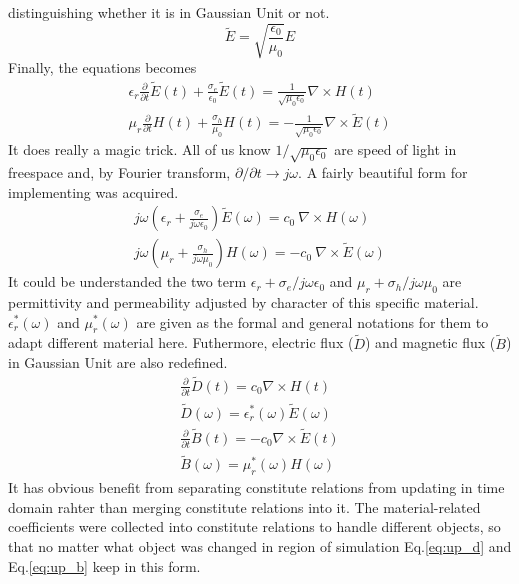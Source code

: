 distinguishing whether it is in Gaussian Unit or not.
\label{eq:gaussian_unit}
\begin{equation}
  {\displaystyle\widetilde{E} = \sqrt{\frac{\epsilon_0}{\mu_0}}E}
\end{equation}
Finally, the equations becomes
\begin{gather}
  \epsilon_r\frac{\partial}{\partial t}\widetilde{E}(t) + \frac{\sigma_e}{\epsilon_0}\widetilde{E}(t) = \frac{1}{\sqrt{\mu_0\epsilon_0}}\nabla\times H(t)\\
  \mu_r\frac{\partial}{\partial t} H(t) + \frac{\sigma_h}{\mu_0}H(t) = - \frac{1}{\sqrt{\mu_0\epsilon_0}}\nabla\times\widetilde{E}(t)
\end{gather}
It does really a magic trick. All of us know $1/\sqrt{\mu_0\epsilon_0}$ are speed of light in freespace and, by Fourier
transform, $\partial/\partial t \rightarrow j\omega$. A fairly beautiful form for implementing was acquired.
\begin{gather}
  j\omega\left(\epsilon_r + \frac{\sigma_e}{j\omega\epsilon_0}\right)\widetilde{E}(\omega) = c_0\ \nabla\times H(\omega)\\
  j\omega\left(\mu_r + \frac{\sigma_h}{j\omega\mu_0}\right)H(\omega) = - c_0\ \nabla\times\widetilde{E}(\omega)
\end{gather}
It could be understanded the two term $\epsilon_r + \sigma_e/j\omega\epsilon_0$ and $\mu_r + \sigma_h/j\omega\mu_0$ are
permittivity and permeability adjusted by character of this specific material. $\epsilon_r^*(\omega)$ and
$\mu_r^*(\omega)$ are given as the formal and general notations for them to adapt different material here. Futhermore,
electric flux ($\widetilde{D}$) and magnetic flux ($\widetilde{B}$) in Gaussian Unit are also redefined.
\begin{gather}
  \frac{\partial}{\partial t}\widetilde{D}(t) = c_0\nabla\times H(t)\label{eq:up_d}\\
  \widetilde{D}(\omega) = \epsilon_r^*(\omega)\widetilde{E}(\omega)\label{eq:cr_d}\\
  \frac{\partial}{\partial t}\widetilde{B}(t) = -c_0\nabla\times\widetilde{E}(t)\label{eq:up_b}\\
  \widetilde{B}(\omega) = \mu_r^*(\omega)H(\omega)\label{eq:cr_b}
\end{gather}
It has obvious benefit from separating constitute relations from updating in time domain rahter than merging constitute
relations into it. The material-related coefficients were collected into constitute relations to handle different
objects, so that no matter what object was changed in region of simulation Eq.\ref{eq:up_d} and Eq.\ref{eq:up_b} keep in
this form.

